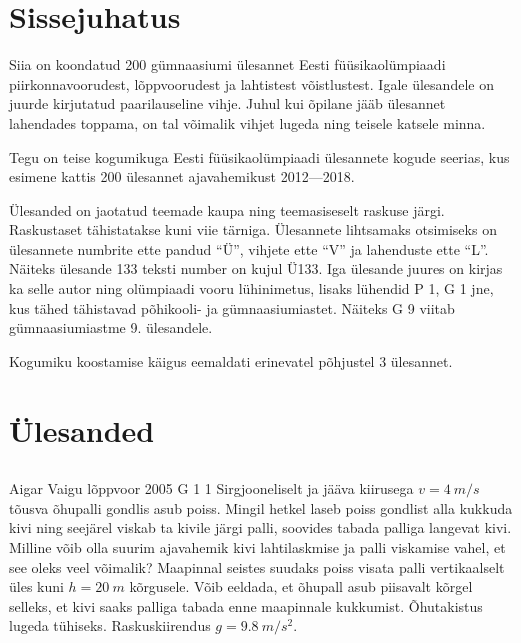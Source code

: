 \documentclass[11pt, twoside]{article}
\begin{document}
{\setlength{\parindent}{24pt}
\section{Sissejuhatus}

Siia on koondatud 200 gümnaasiumi ülesannet Eesti füüsikaolümpiaadi piirkonnavoorudest, lõppvoorudest ja lahtistest võistlustest. Igale ülesandele on juurde kirjutatud paarilauseline vihje. Juhul kui õpilane jääb ülesannet lahendades toppama, on tal võimalik vihjet lugeda ning teisele katsele minna.

Tegu on teise kogumikuga Eesti füüsikaolümpiaadi ülesannete kogude seerias, kus esimene kattis 200 ülesannet ajavahemikust 2012---2018.

Ülesanded on jaotatud teemade kaupa ning teemasiseselt raskuse järgi. Raskustaset tähistatakse kuni viie tärniga. Ülesannete lihtsamaks otsimiseks on ülesannete numbrite ette pandud \enquote{Ü}, vihjete ette \enquote{V} ja lahenduste ette \enquote{L}. Näiteks ülesande 133 teksti number on kujul Ü133. Iga ülesande juures on kirjas ka selle autor ning olümpiaadi vooru lühinimetus, lisaks lühendid P 1, G 1 jne, kus tähed tähistavad põhikooli- ja gümnaasiumiastet. Näiteks G 9 viitab gümnaasiumiastme 9. ülesandele.

Kogumiku koostamise käigus eemaldati erinevatel põhjustel 3 ülesannet.
\newpage
\setlength{\parindent}{0pt}

        \section{Ülesanded}
        \ToggleStatement
        \subsection{\protect{}}

\graphicspath{{../problems/}}

{Aigar Vaigu} %
{lõppvoor} %
{2005} %
{G 1} %
{1} %
{
\ifStatement
Sirgjooneliselt ja jääva kiirusega $v = \SI{4}{m/s}$ tõusva õhupalli gondlis asub poiss. Mingil hetkel laseb poiss gondlist alla kukkuda kivi ning seejärel viskab ta kivile järgi palli, soovides tabada palliga langevat kivi. Milline võib olla suurim ajavahemik kivi lahtilaskmise ja palli viskamise vahel, et see oleks veel võimalik? Maapinnal seistes suudaks poiss visata palli vertikaalselt üles kuni $h = \SI{20}{m}$ kõrgusele. Võib eeldada, et õhupall asub piisavalt kõrgel selleks, et kivi saaks palliga tabada enne maapinnale kukkumist. Õhutakistus lugeda tühiseks. Raskuskiirendus $g = \SI{9,8}{m/s^2}$.
\fi
}

}
\end{document}
